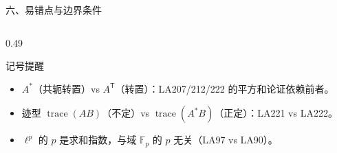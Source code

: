 \documentclass[aspectratio=169,10pt,fontset=none]{ctexbeamer}
\begin{document}
\begin{frame}[t]{六、易错点与边界条件}
\begin{columns}[T,onlytextwidth]
\begin{column}{0.49\textwidth}
\begin{block}{\footnotesize 记号提醒}
        \begin{itemize}\setlength{\itemsep}{1pt}
          \item $A^*$（共轭转置）vs $A^{\mathsf T}$（转置）：LA207/212/222 的平方和论证依赖前者。
          \item 迹型 $\operatorname{trace}(AB)$（不定）vs $\operatorname{trace}(A^*B)$（正定）：LA221 vs LA222。
          \item $\ell^p$ 的 $p$ 是求和指数，与域 $\mathbb F_p$ 的 $p$ 无关（LA97 vs LA90）。
        \end{itemize}
      \end{block}
    \end{column}
  \end{columns}
\end{frame}

\end{document}
